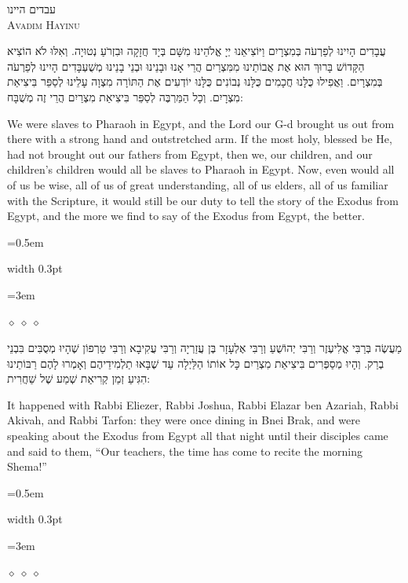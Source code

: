 \documentclass[11pt, openany]{book}
\newlength{\bidiHebWidth}
\newlength{\bidiEngWidth}
\newenvironment{bilingual}{%
  \par\vspace{4pt}%
}{%
  \noindent
  \begin{minipage}[t]{\bidiEngWidth}
    \setstretch{1.4}\emergencystretch=0.5em\normalsize
    \usebox{\bidiEngBox}
  \end{minipage}%
  \hfill
  {\color{sedergold}\vrule width 0.3pt}%
  \hfill
  \begin{minipage}[t]{\bidiHebWidth}
    \begingroup\hebrewfont\TeXXeTstate=1\beginR
    \large\setstretch{1.4}\emergencystretch=3em\tolerance=9999\parindent=0pt\relax
    \usebox{\bidiHebBox}
    \endR\endgroup
  \end{minipage}%
  \par\vspace{2pt}%
}
\newenvironment{hebrewcol}{%
  \begin{lrbox}{\bidiHebBox}\begin{minipage}{\bidiHebWidth}%
}{%
  \end{minipage}\end{lrbox}%
}
\newenvironment{englishcol}{%
  \begin{lrbox}{\bidiEngBox}\begin{minipage}{\bidiEngWidth}%
}{%
  \end{minipage}\end{lrbox}%
}
\newcommand{\parasep}{%
  \par\vspace{3pt}
  \begin{center}
    \textcolor{sedergold!50}{\tiny$\diamond\;\diamond\;\diamond$}
  \end{center}
  \par\vspace{3pt}
}
\newcommand{\subsedertitle}[2]{%
  \par\vspace{8pt}
  \begin{center}
    {\hebrewfontlarge\TeXXeTstate=1\beginR\textcolor{sederblue}{#1}\endR}\\[3pt]
    {\normalsize\scshape\textcolor{sederblue}{#2}}
  \end{center}
  \par\vspace{3pt}
}
\begin{document}

\subsedertitle{עבדים היינו}{Avadim Hayinu}

\begin{bilingual}
\begin{hebrewcol}
עֲבָדִים הָיִינוּ לְפַרְעֹה בְּמִצְרָיִם וַיּוֹצִיאֵנוּ יְיָ אֱלֹהֵינוּ מִשָּׁם בְּיָד חֲזָקָה וּבִזְרֹעַ נְטוּיָה. וְאִלּוּ לֹא הוֹצִיא הַקָּדוֹשׁ בָּרוּךְ הוּא אֶת אֲבוֹתֵינוּ מִמִּצְרַיִם הֲרֵי אָנוּ וּבָנֵינוּ וּבְנֵי בָנֵינוּ מְשֻׁעְבָּדִים הָיִינוּ לְפַרְעֹה בְּמִצְרָיִם. וַאֲפִילוּ כֻּלָּנוּ חֲכָמִים כֻּלָּנוּ נְבוֹנִים כֻּלָּנוּ יוֹדְעִים אֶת הַתּוֹרָה מִצְוָה עָלֵינוּ לְסַפֵּר בִּיצִיאַת מִצְרָיִם. וְכָל הַמַּרְבֶּה לְסַפֵּר בִּיצִיאַת מִצְרַיִם הֲרֵי זֶה מְשֻׁבָּח:
\end{hebrewcol}
\begin{englishcol}
We were slaves to Pharaoh in Egypt, and the Lord our G-d brought us out from there with a strong hand and outstretched arm. If the most holy, blessed be He, had not brought out our fathers from Egypt, then we, our children, and our children's children would all be slaves to Pharaoh in Egypt. Now, even would all of us be wise, all of us of great understanding, all of us elders, all of us familiar with the Scripture, it would still be our duty to tell the story of the Exodus from Egypt, and the more we find to say of the Exodus from Egypt, the better.
\end{englishcol}
\end{bilingual}
\parasep

\begin{bilingual}
\begin{hebrewcol}
מַעֲשֶׂה בְּרַבִּי אֱלִיעֶזֶר וְרַבִּי יְהוֹשֻׁעַ וְרַבִּי אֶלְעָזָר בֶּן עֲזַרְיָה וְרַבִּי עֲקִיבָא וְרַבִּי טַרְפוֹן שֶׁהָיוּ מְסֻבִּים בִּבְנֵי בְרַק. וְהָיוּ מְסַפְּרִים בִּיצִיאַת מִצְרַיִם כָּל אוֹתוֹ הַלַּיְלָה עַד שֶׁבָּאוּ תַלְמִידֵיהֶם וְאָמְרוּ לָהֶם רַבּוֹתֵינוּ הִגִּיעַ זְמַן קְרִיאַת שְׁמַע שֶׁל שַׁחֲרִית:
\end{hebrewcol}
\begin{englishcol}
It happened with Rabbi Eliezer, Rabbi Joshua, Rabbi Elazar ben Azariah, Rabbi Akivah, and Rabbi Tarfon: they were once dining in Bnei Brak, and were speaking about the Exodus from Egypt all that night until their disciples came and said to them, ``Our teachers, the time has come to recite the morning Shema!''
\end{englishcol}
\end{bilingual}
\parasep
\end{document}
